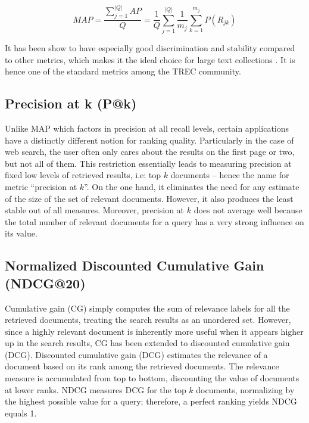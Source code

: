 \begin{equation}
MAP = \frac{\sum^{|Q|} _{j = 1} AP}{Q} = \frac{1}{Q} \sum^{|Q|} _{j = 1} \frac{1}{m_j} \sum^{m_j} _{k = 1} P(R_{jk})
\end{equation}


It has been show to have especially good discrimination and stability compared to other metrics, which makes it the ideal choice for large text collections \cite{manning2010introduction}.
It is hence one of the standard metrics among the TREC community.

\subsection{Precision at k (P@k)}

Unlike MAP which factors in precision at all recall levels, certain applications have a distinctly different notion for ranking quality.
Particularly in the case of web search, the user often only cares about the results on the first page or two, but not all of them.
This restriction essentially leads to measuring precision at fixed low levels of retrieved results, i.e: top $ k $ documents -- hence the name for metric ``precision at $ k $''.
On the one hand, it eliminates the need for any estimate of the size of the set of relevant documents.
However, it also produces the least stable out of all measures.
Moreover, precision at $ k $ does not average well because the total number of relevant documents for a query has a very strong influence on its value. 

\subsection{Normalized Discounted Cumulative Gain (NDCG@20)}

Cumulative gain (CG) simply computes the sum of relevance labels for all the retrieved documents, treating the search results as an unordered set.
However, since a highly relevant document is inherently more useful when it appears higher up in the search results, CG has been extended to discounted cumulative gain (DCG).
Discounted cumulative gain (DCG) estimates the relevance of a document based on its rank among the retrieved documents.
The relevance measure is accumulated from top to bottom, discounting the value of documents at lower ranks.
NDCG measures DCG for the top $ k $ documents, normalizing by the highest possible value for a query; therefore, a perfect ranking yields NDCG equals 1.

